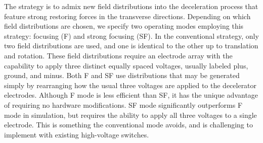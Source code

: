 \documentclass[%
 reprint,
 amsmath,amssymb,
 aps,
prl,
]{revtex4-1}
\begin{document}
The strategy is to admix new field distributions into the deceleration process that feature strong restoring forces in the transverse directions.
Depending on which field distributions are chosen, we specify two operating modes employing this strategy: focusing (F) and strong focusing (SF).
In the conventional strategy, only two field distributions are used, and one is identical to the other up to translation and rotation.
These field distributions require an electrode array with the capability to apply three distinct equally spaced voltages, usually labeled plus, ground, and minus.
Both F and SF use distributions that may be generated simply by rearranging how the usual three voltages are applied to the decelerator electrodes.
Although F mode is less efficient than SF, it has the unique advantage of requiring no hardware modifications.
SF mode significantly outperforms F mode in simulation, but requires the ability to apply all three voltages to a single electrode.
This is something the conventional mode avoids, and is challenging to implement with existing high-voltage switches.
\end{document}
